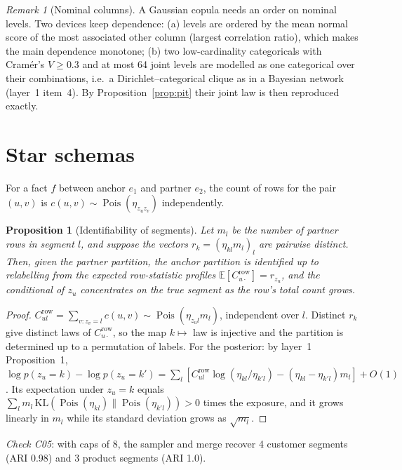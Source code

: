 \documentclass[11pt,a4paper]{article}
\newtheorem{proposition}{Proposition}
\theoremstyle{definition}
\theoremstyle{remark}
\newtheorem{remark}{Remark}
\newcommand{\E}{\mathbb{E}}
\newcommand{\Pois}{\operatorname{Pois}}
\begin{document}
\begin{remark}[Nominal columns]\label{rem:nominal}
A Gaussian copula needs an order on nominal levels. Two devices keep dependence:
(a) levels are ordered by the mean normal score of the most associated other column (largest correlation ratio), which makes the main dependence monotone;
(b) two low-cardinality categoricals with Cram\'er's $V\ge0.3$ and at most 64 joint levels are modelled as one categorical over their combinations, i.e.\ a Dirichlet--categorical clique as in a Bayesian network (layer~1 item~4). By Proposition~\ref{prop:pit} their joint law is then reproduced exactly.
\end{remark}

\section{Star schemas}\label{sec:star}
For a fact $f$ between anchor $e_1$ and partner $e_2$, the count of rows for the pair $(u,v)$ is $c(u,v)\sim\Pois(\eta_{z_uz_v})$ independently.

\begin{proposition}[Identifiability of segments]\label{prop:ident}
Let $m_l$ be the number of partner rows in segment $l$, and suppose the vectors $r_k=(\eta_{kl}m_l)_{l}$ are pairwise distinct. Then, given the partner partition, the anchor partition is identified up to relabelling from the expected row-statistic profiles $\E[C^{\mathrm{row}}_{u\cdot}]=r_{z_u}$, and the conditional of $z_u$ concentrates on the true segment as the row's total count grows.
\end{proposition}
\begin{proof}
$C^{\mathrm{row}}_{ul}=\sum_{v:z_v=l}c(u,v)\sim\Pois(\eta_{z_ul}m_l)$, independent over $l$. Distinct $r_k$ give distinct laws of $C^{\mathrm{row}}_{u\cdot}$, so the map $k\mapsto$ law is injective and the partition is determined up to a permutation of labels. For the posterior: by layer~1 Proposition~1, $\log p(z_u=k)-\log p(z_u=k')=\sum_l[C^{\mathrm{row}}_{ul}\log(\eta_{kl}/\eta_{k'l})-(\eta_{kl}-\eta_{k'l})m_l]+O(1)$. Its expectation under $z_u=k$ equals $\sum_l m_l\,\mathrm{KL}(\Pois(\eta_{kl})\|\Pois(\eta_{k'l}))>0$ times the exposure, and it grows linearly in $m_l$ while its standard deviation grows as $\sqrt{m_l}$.
\end{proof}
\noindent\emph{Check C05}: with caps of 8, the sampler and merge recover 4 customer segments (ARI 0.98) and 3 product segments (ARI 1.0).
\end{document}
